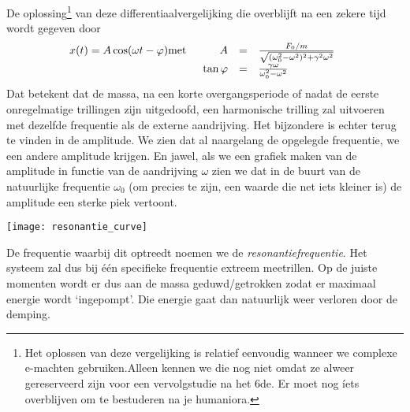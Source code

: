 \documentclass{ximera}
\begin{document}
	De oplossing\footnote{Het oplossen van deze vergelijking is relatief eenvoudig wanneer we complexe e-machten gebruiken.\footnotemark Alleen kennen we die nog niet omdat ze alweer gereserveerd zijn voor een vervolgstudie na het 6de. Er moet nog \'iets overblijven om te bestuderen na je humaniora.} van deze differentiaalvergelijking die overblijft na een zekere tijd wordt gegeven door
	\begin{eqnarray*}
	x(t)=A\cos(\omega t-\varphi)&\mathrm{met}&
	\begin{array}[t]{rcl}
	\displaystyle A&=&\frac{F_0/m}{\sqrt{(\omega_0^2-\omega^2)^2+\gamma^2\omega^2}}\\
	\displaystyle\tan\varphi&=&\frac{\gamma\omega}{\omega_0^2-\omega^2}
	\end{array}
	\end{eqnarray*}
	Dat betekent dat de massa, na een korte overgangsperiode of nadat de eerste onregelmatige trillingen zijn uitgedoofd, een harmonische trilling zal uitvoeren met dezelfde frequentie als de externe aandrijving. Het bijzondere is echter terug te vinden in de amplitude. We zien dat al naargelang de opgelegde frequentie, we een andere amplitude krijgen. En jawel, als we een grafiek maken van de amplitude in functie van de aandrijving $\omega$ zien we dat in de buurt van de natuurlijke frequentie $\omega_0$ (om precies te zijn, een waarde die net iets kleiner is) de amplitude een sterke piek vertoont. 
	\begin{image}
	
	\texttt{[image: resonantie\_curve]}
	\end{image}
	De frequentie waarbij dit optreedt noemen we de \emph{resonantiefrequentie}. Het systeem zal dus bij \'e\'en specifieke frequentie extreem meetrillen. Op de juiste momenten wordt er dus aan de massa geduwd/getrokken zodat er maximaal energie wordt `ingepompt'. Die energie gaat dan natuurlijk weer verloren door de demping.
	
\end{document}
